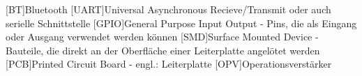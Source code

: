 
\begin{acronym}[ACRONYM]
[BT]{Bluetooth}
[UART]{Universal Asynchronous Recieve/Transmit oder auch serielle Schnittstelle}
[GPIO]{General Purpose Input Output - Pins, die als Eingang oder Ausgang verwendet werden können}
[SMD]{Surface Mounted Device - Bauteile, die direkt an der Oberfläche einer Leiterplatte angelötet werden}
[PCB]{Printed Circuit Board - engl.: Leiterplatte}
[OPV]{Operationsverstärker}
\end{acronym}\newpage

